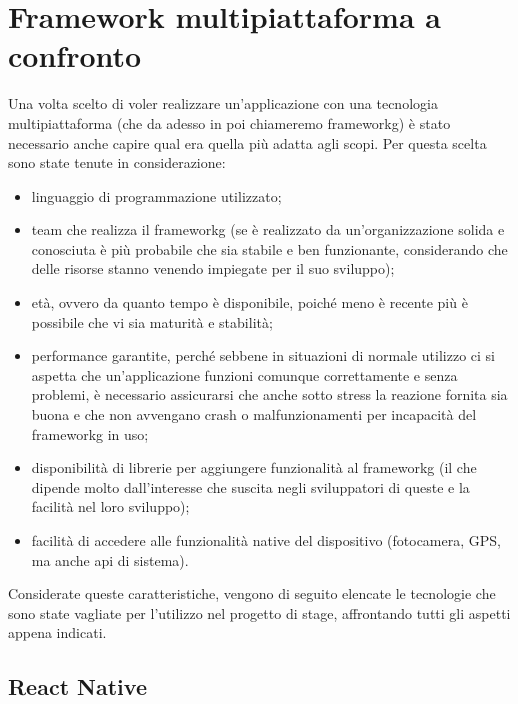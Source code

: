 \section{Framework multipiattaforma a confronto}
\label{sec:multipiattaforma-confronto}

Una volta scelto di voler realizzare un'applicazione con una tecnologia multipiattaforma (che da adesso in poi chiameremo \gls{frameworkg})  è stato necessario anche capire qual era quella più adatta agli scopi. Per questa scelta sono state tenute in considerazione:
\begin{itemize}
    \item linguaggio di programmazione utilizzato;
    \item team che realizza il \gls{frameworkg} (se è realizzato da un'organizzazione solida e conosciuta è più probabile che sia stabile e ben funzionante, considerando che delle risorse stanno venendo impiegate per il suo sviluppo);
    \item età, ovvero da quanto tempo è disponibile, poiché meno è recente più è possibile che vi sia maturità e stabilità;
    \item performance garantite, perché sebbene in situazioni di normale utilizzo ci si aspetta che un'applicazione funzioni comunque correttamente e senza problemi, è necessario assicurarsi che anche sotto stress la reazione fornita sia buona e che non avvengano crash o malfunzionamenti per incapacità del \gls{frameworkg} in uso;
    \item disponibilità di librerie per aggiungere funzionalità al \gls{frameworkg} (il che dipende molto dall'interesse che suscita negli sviluppatori di queste e la facilità nel loro sviluppo);
    \item facilità di accedere alle funzionalità native del dispositivo (fotocamera, GPS, ma anche \gls{api} di sistema). 
\end{itemize}
Considerate queste caratteristiche, vengono di seguito elencate le tecnologie che sono state vagliate per l'utilizzo nel progetto di stage, affrontando tutti gli aspetti appena indicati.

\subsection{React Native}
\label{subsec:react-native}

